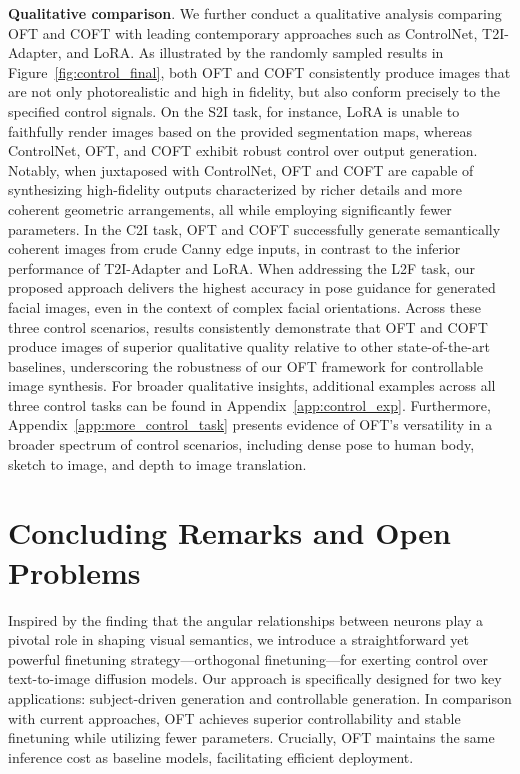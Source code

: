 \textbf{Qualitative comparison}. We further conduct a qualitative analysis comparing OFT and COFT with leading contemporary approaches such as ControlNet, T2I-Adapter, and LoRA. As illustrated by the randomly sampled results in Figure~\ref{fig:control_final}, both OFT and COFT consistently produce images that are not only photorealistic and high in fidelity, but also conform precisely to the specified control signals. On the S2I task, for instance, LoRA is unable to faithfully render images based on the provided segmentation maps, whereas ControlNet, OFT, and COFT exhibit robust control over output generation. Notably, when juxtaposed with ControlNet, OFT and COFT are capable of synthesizing high-fidelity outputs characterized by richer details and more coherent geometric arrangements, all while employing significantly fewer parameters. In the C2I task, OFT and COFT successfully generate semantically coherent images from crude Canny edge inputs, in contrast to the inferior performance of T2I-Adapter and LoRA. When addressing the L2F task, our proposed approach delivers the highest accuracy in pose guidance for generated facial images, even in the context of complex facial orientations. Across these three control scenarios, results consistently demonstrate that OFT and COFT produce images of superior qualitative quality relative to other state-of-the-art baselines, underscoring the robustness of our OFT framework for controllable image synthesis. For broader qualitative insights, additional examples across all three control tasks can be found in Appendix~\ref{app:control_exp}. Furthermore, Appendix~\ref{app:more_control_task} presents evidence of OFT's versatility in a broader spectrum of control scenarios, including dense pose to human body, sketch to image, and depth to image translation.

\section{Concluding Remarks and Open Problems}

Inspired by the finding that the angular relationships between neurons play a pivotal role in shaping visual semantics, we introduce a straightforward yet powerful finetuning strategy—orthogonal finetuning—for exerting control over text-to-image diffusion models. Our approach is specifically designed for two key applications: subject-driven generation and controllable generation. In comparison with current approaches, OFT achieves superior controllability and stable finetuning while utilizing fewer parameters. Crucially, OFT maintains the same inference cost as baseline models, facilitating efficient deployment.

